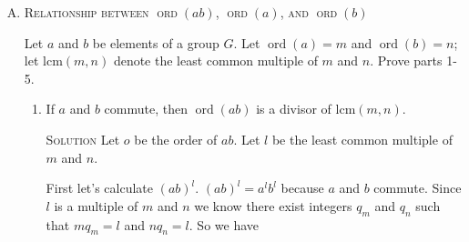 \documentclass[twoside]{amsart}
\newcommand{\solution}{\textsc{Solution}\xspace}
\newcommand{\blank}{\vspace{5pt}}
\newcommand{\itm}{\blank\item}
\newcommand{\sol}{\blank\noindent\solution}
\newcommand{\ord}{\mathop{\mathrm{ord}}}
\begin{document}
\begin{enumerate}[A.]
\begin{enumerate}[1]
      \itm If $a$ is the \emph{only} element of order $k$ in $G$, then
      $a$ is in the center of $G$. (\textsc{Hint}: Use Exercise C4.
      Also, see Chapter 4, Exercise C6.)

      \sol Given $\ord(a)=k$. Therefore, for any element $b \in G$
      (by part C4), we have $\ord(bab^{-1}) = k$. Therefore $(bab^{-1})^k = e$.

      By Chapter 4 C6 $ab = ba$ iff $bab^{-1} = a$. 

      STUMPED!!!

      \itm If the order of $a$ is not a multiple of $m$, then
      the order of $a^k$ is not a multiple of $m$.

      \sol Given that the order of $a$ is not a multiple of $m$.
      Assume that order of $a^k$ is a multiple of $m$. Then
      for some integer $q_1 \geq 1$ we have $\ord(a^k) = q_1m$.
      By part 2 we know that the order of $a$ is a multiple of
      the order of $a^k$. Therefore there is some $q_2$ such
      that $\ord(a) = q_2 \ord(a^k) = q_2 q_1 m$. Therefore
      order of $a$ is a multiple of $m$. But this contradicts
      our premise. So order of $a^k$ must not be a multiple of $m$.$\qed$.

      \itm If $\ord(a) = mk$ and $a^{rk} = e$, then $r$ is a multiple of $m$.

      \sol We know by theorem 5 that $rk$ is a multiple of $mk$. 
      So $rk = qmk$ for some $q \ne 0$.  So $r = qm$. So $r$ is a multiple
      of $m$. $\qed$

   \end{enumerate}
   
   \itm \textsc{Relationship between $\ord(ab)$, $\ord(a)$, and $\ord(b)$}

   \noindent Let $a$ and $b$ be elements of a group $G$. Let $\ord(a)=m$ and
   $\ord(b)=n$; let $\mathrm{lcm}(m,n)$ denote the least common multiple
   of $m$ and $n$. Prove parts 1-5.

   \begin{enumerate}[1]
      \itm If $a$ and $b$ commute, then $\ord(ab)$ is a divisor of 
      $\mathrm{lcm}(m,n)$. 

      \sol Let $o$ be the order of $ab$. Let $l$ be the least common
      multiple of $m$ and $n$.

      First let's calculate $(ab)^l$. $(ab)^l = a^lb^l$ because
      $a$ and $b$ commute. Since $l$ is a multiple of $m$ and $n$
      we know there exist integers $q_m$ and $q_n$ such that
      $mq_m = l$ and $nq_n = l$. So we have 
      

\end{enumerate}
\end{enumerate}
\end{document}
